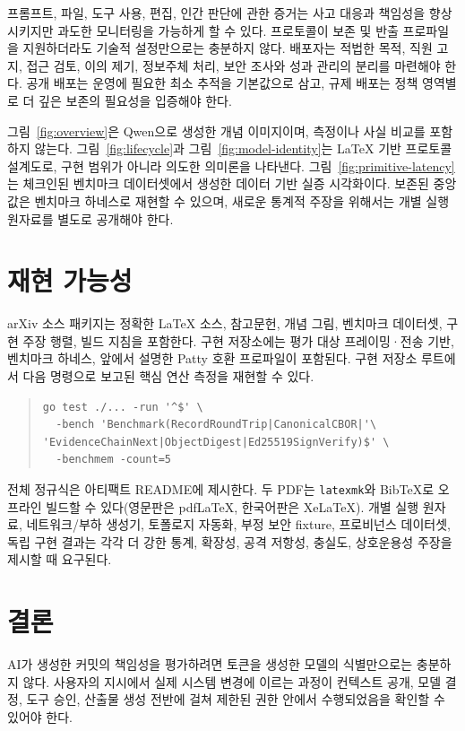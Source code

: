 \documentclass[10pt]{article}
\begin{document}
프롬프트, 파일, 도구 사용, 편집, 인간 판단에 관한 증거는 사고 대응과 책임성을 향상시키지만 과도한 모니터링을 가능하게 할 수 있다. 프로토콜이 보존 및 반출 프로파일을 지원하더라도 기술적 설정만으로는 충분하지 않다. 배포자는 적법한 목적, 직원 고지, 접근 검토, 이의 제기, 정보주체 처리, 보안 조사와 성과 관리의 분리를 마련해야 한다. 공개 배포는 운영에 필요한 최소 추적을 기본값으로 삼고, 규제 배포는 정책 영역별로 더 깊은 보존의 필요성을 입증해야 한다.

그림~\ref{fig:overview}은 Qwen으로 생성한 개념 이미지이며, 측정이나 사실 비교를 포함하지 않는다. 그림~\ref{fig:lifecycle}과 그림~\ref{fig:model-identity}는 LaTeX 기반 프로토콜 설계도로, 구현 범위가 아니라 의도한 의미론을 나타낸다. 그림~\ref{fig:primitive-latency}는 체크인된 벤치마크 데이터셋에서 생성한 데이터 기반 실증 시각화이다. 보존된 중앙값은 벤치마크 하네스로 재현할 수 있으며, 새로운 통계적 주장을 위해서는 개별 실행 원자료를 별도로 공개해야 한다.

\section{재현 가능성}

arXiv 소스 패키지는 정확한 LaTeX 소스, 참고문헌, 개념 그림, 벤치마크 데이터셋, 구현 주장 행렬, 빌드 지침을 포함한다. 구현 저장소에는 평가 대상 프레이밍·전송 기반, 벤치마크 하네스, 앞에서 설명한 Patty 호환 프로파일이 포함된다. 구현 저장소 루트에서 다음 명령으로 보고된 핵심 연산 측정을 재현할 수 있다.

\begin{quote}\small
\begin{verbatim}
go test ./... -run '^$' \
  -bench 'Benchmark(RecordRoundTrip|CanonicalCBOR|'\
'EvidenceChainNext|ObjectDigest|Ed25519SignVerify)$' \
  -benchmem -count=5
\end{verbatim}
\end{quote}

전체 정규식은 아티팩트 README에 제시한다. 두 PDF는 \texttt{latexmk}와 BibTeX로 오프라인 빌드할 수 있다(영문판은 pdfLaTeX, 한국어판은 XeLaTeX). 개별 실행 원자료, 네트워크/부하 생성기, 토폴로지 자동화, 부정 보안 fixture, 프로비넌스 데이터셋, 독립 구현 결과는 각각 더 강한 통계, 확장성, 공격 저항성, 충실도, 상호운용성 주장을 제시할 때 요구된다.

\section{결론}

AI가 생성한 커밋의 책임성을 평가하려면 토큰을 생성한 모델의 식별만으로는 충분하지 않다. 사용자의 지시에서 실제 시스템 변경에 이르는 과정이 컨텍스트 공개, 모델 결정, 도구 승인, 산출물 생성 전반에 걸쳐 제한된 권한 안에서 수행되었음을 확인할 수 있어야 한다.
\end{document}
